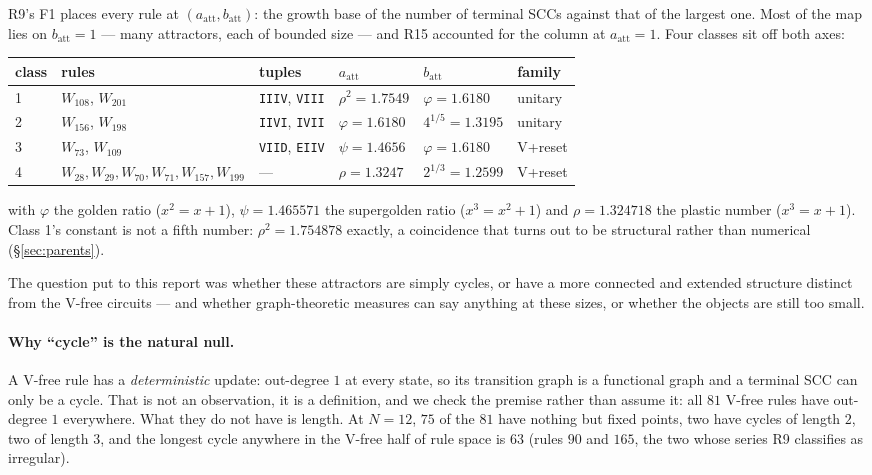 \documentclass[11pt]{article}
\newcommand{\rt}[1]{\texttt{#1}}
\newcommand{\att}{\mathrm{att}}
\theoremstyle{plain}
\begin{document}
R9's F1 places every rule at $(a_\att, b_\att)$: the growth base of the number of
terminal SCCs against that of the largest one. Most of the map lies on
$b_\att=1$ --- many attractors, each of bounded size --- and R15 accounted for
the column at $a_\att=1$. Four classes sit off both axes:

\begin{center}
\begin{tabular}{llllll}
\toprule
class & rules & tuples & $a_\att$ & $b_\att$ & family \\
\midrule
1 & $W_{108}$, $W_{201}$ & \rt{IIIV}, \rt{VIII} & $\rho^2=1.7549$ &
  $\varphi=1.6180$ & unitary \\
2 & $W_{156}$, $W_{198}$ & \rt{IIVI}, \rt{IVII} & $\varphi=1.6180$ &
  $4^{1/5}=1.3195$ & unitary \\
3 & $W_{73}$, $W_{109}$ & \rt{VIID}, \rt{EIIV} & $\psi=1.4656$ &
  $\varphi=1.6180$ & V+reset \\
4 & $W_{28},W_{29},W_{70},W_{71},W_{157},W_{199}$ & --- & $\rho=1.3247$ &
  $2^{1/3}=1.2599$ & V+reset \\
\bottomrule
\end{tabular}
\end{center}

\noindent with $\varphi$ the golden ratio ($x^2=x+1$), $\psi=1.465571$ the
supergolden ratio ($x^3=x^2+1$) and $\rho=1.324718$ the plastic number
($x^3=x+1$). Class 1's constant is not a fifth number: $\rho^2=1.754878$
exactly, a coincidence that turns out to be structural rather than numerical
(\S\ref{sec:parents}).

The question put to this report was whether these attractors are simply cycles,
or have a more connected and extended structure distinct from the V-free
circuits --- and whether graph-theoretic measures can say anything at these
sizes, or whether the objects are still too small.

\paragraph{Why ``cycle'' is the natural null.} A V-free rule has a
\emph{deterministic} update: out-degree $1$ at every state, so its transition
graph is a functional graph and a terminal SCC can only be a cycle. That is not
an observation, it is a definition, and we check the premise rather than assume
it: all $81$ V-free rules have out-degree $1$ everywhere. What they do not have
is length. At $N=12$, $75$ of the $81$ have nothing but fixed points, two have
cycles of length $2$, two of length $3$, and the longest cycle anywhere in the
V-free half of rule space is $63$ (rules $90$ and $165$, the two whose series R9
classifies as irregular).
\end{document}
